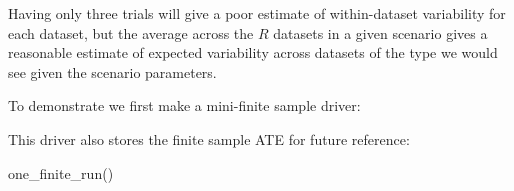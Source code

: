 \documentclass[
]{book}
\newenvironment{Shaded}{\begin{snugshade}}{\end{snugshade}}
\newcommand{\AttributeTok}[1]{\textcolor[rgb]{0.77,0.63,0.00}{#1}}
\newcommand{\ControlFlowTok}[1]{\textcolor[rgb]{0.13,0.29,0.53}{\textbf{#1}}}
\newcommand{\DecValTok}[1]{\textcolor[rgb]{0.00,0.00,0.81}{#1}}
\newcommand{\FunctionTok}[1]{\textcolor[rgb]{0.00,0.00,0.00}{#1}}
\newcommand{\NormalTok}[1]{#1}
\newcommand{\OtherTok}[1]{\textcolor[rgb]{0.56,0.35,0.01}{#1}}
\newcommand{\SpecialCharTok}[1]{\textcolor[rgb]{0.00,0.00,0.00}{#1}}
\newcommand{\StringTok}[1]{\textcolor[rgb]{0.31,0.60,0.02}{#1}}
\begin{document}
Having only three trials will give a poor estimate of within-dataset variability for each dataset, but the average across the
\(R\) datasets in a given scenario gives a reasonable estimate of expected variability across datasets of the type we would see given the scenario parameters.

To demonstrate we first make a mini-finite sample driver:

\begin{Shaded}
\end{Shaded}

This driver also stores the finite sample ATE for future reference:

\begin{Shaded}
\begin{Highlighting}[]
\FunctionTok{one\_finite\_run}\NormalTok{()}
\end{Highlighting}
\end{Shaded}
\end{document}
